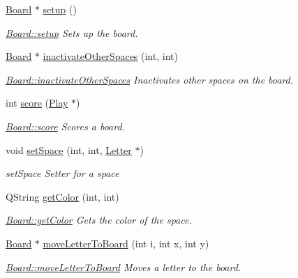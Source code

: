 \begin{DoxyCompactItemize}
\hyperlink{class_board}{Board} $\ast$ \hyperlink{class_board_a43514bd0ab816eaed9affaace84686fe}{setup} ()
\begin{DoxyCompactList}\small\item\em \hyperlink{class_board_a43514bd0ab816eaed9affaace84686fe}{Board\-::setup} Sets up the board. \end{DoxyCompactList}\item 
\hyperlink{class_board}{Board} $\ast$ \hyperlink{class_board_a61a3bf8888e7969e3b34d7df279b495d}{inactivate\-Other\-Spaces} (int, int)
\begin{DoxyCompactList}\small\item\em \hyperlink{class_board_a61a3bf8888e7969e3b34d7df279b495d}{Board\-::inactivate\-Other\-Spaces} Inactivates other spaces on the board. \end{DoxyCompactList}\item 
int \hyperlink{class_board_a48c3a272cb4a47509ddd88edaec2bb59}{score} (\hyperlink{class_play}{Play} $\ast$)
\begin{DoxyCompactList}\small\item\em \hyperlink{class_board_a48c3a272cb4a47509ddd88edaec2bb59}{Board\-::score} Scores a board. \end{DoxyCompactList}\item 
void \hyperlink{class_board_ac19eb0e5a0936b89d6070d1cb96d107a}{set\-Space} (int, int, \hyperlink{class_letter}{Letter} $\ast$)
\begin{DoxyCompactList}\small\item\em set\-Space Setter for a space \end{DoxyCompactList}\item 
Q\-String \hyperlink{class_board_a5220c9a416ea7217a6fa21b6b25e7c35}{get\-Color} (int, int)
\begin{DoxyCompactList}\small\item\em \hyperlink{class_board_a5220c9a416ea7217a6fa21b6b25e7c35}{Board\-::get\-Color} Gets the color of the space. \end{DoxyCompactList}\item 
\hyperlink{class_board}{Board} $\ast$ \hyperlink{class_board_a8ed329bcdb775a910a575161ee5221ac}{move\-Letter\-To\-Board} (int i, int x, int y)
\begin{DoxyCompactList}\small\item\em \hyperlink{class_board_a8ed329bcdb775a910a575161ee5221ac}{Board\-::move\-Letter\-To\-Board} Moves a letter to the board. \end{DoxyCompactList}\end{DoxyCompactItemize}
